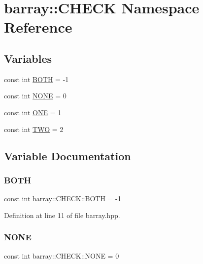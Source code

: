 \hypertarget{namespacebarray_1_1_c_h_e_c_k}{}\section{barray\+:\+:C\+H\+E\+CK Namespace Reference}
\label{namespacebarray_1_1_c_h_e_c_k}
\subsection*{Variables}
\begin{DoxyCompactItemize}
\item 
const int \hyperlink{namespacebarray_1_1_c_h_e_c_k_a7a865c6f497eff46b0ea15c571e3b2ba}{B\+O\+TH} = -\/1
\item 
const int \hyperlink{namespacebarray_1_1_c_h_e_c_k_a2db5257d8075729d9b1f653278878ff9}{N\+O\+NE} = 0
\item 
const int \hyperlink{namespacebarray_1_1_c_h_e_c_k_a2af137b83f5e63312e153d4aca303e1c}{O\+NE} = 1
\item 
const int \hyperlink{namespacebarray_1_1_c_h_e_c_k_a1d786f922bc95bbff0bd33a5ba0e04d3}{T\+WO} = 2
\end{DoxyCompactItemize}


\subsection{Variable Documentation}
\mbox{\label{namespacebarray_1_1_c_h_e_c_k_a7a865c6f497eff46b0ea15c571e3b2ba}} 
\subsubsection{\texorpdfstring{B\+O\+TH}{BOTH}}
{\footnotesize\ttfamily const int barray\+::\+C\+H\+E\+C\+K\+::\+B\+O\+TH = -\/1}



Definition at line 11 of file barray.\+hpp.

\mbox{\label{namespacebarray_1_1_c_h_e_c_k_a2db5257d8075729d9b1f653278878ff9}} 
\subsubsection{\texorpdfstring{N\+O\+NE}{NONE}}
{\footnotesize\ttfamily const int barray\+::\+C\+H\+E\+C\+K\+::\+N\+O\+NE = 0}



